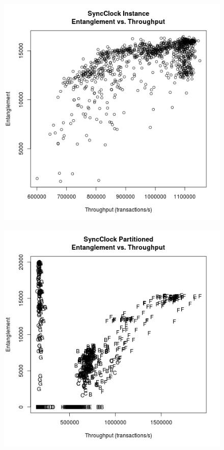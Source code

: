 \begin{figure}
\center
\includegraphics[height=.25\textheight]{sync_instance_throughput_entanglement.png}
\caption{\label{sync_instance_throughput_entanglement}}
\end{figure}

\begin{figure}
\center
\includegraphics[height=.25\textheight]{sync_partitioned_throughput_entanglement.png}
\caption{\label{sync_partitioned_throughput_entanglement}}
\end{figure}

